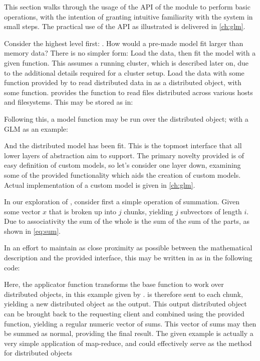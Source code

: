 This section walks through the usage of the API of the \lso module to perform basic operations, with the intention of granting intuitive familiarity with the system in small steps.
The practical use of the API as illustrated is delivered in \cref{ch:glm}.

Consider the highest level first: \lsm.
How would a pre-made model fit larger than memory data?
There is no simpler form: Load the data, then fit the model with a given function.
This assumes a running cluster, which is described later on, due to the additional details required for a cluster setup.
Load the data with some function provided by \lso to read distributed data in as a distributed object, with some  function.
\lso provides the  function to read  files distributed across various hosts and filesystems.
This may be stored as in:


Following this, a model function may be run over the distributed object; with a GLM as an example:


And the distributed model has been fit.
This is the topmost interface that all lower layers of abstraction aim to support.
The primary novelty provided is of easy definition of custom models, so let's consider one layer down, examining some of the provided functionality which aids the creation of custom models.
Actual implementation of a custom model is given in \cref{ch:glm}.

In our exploration of \lso, consider first a simple operation of summation.
Given some vector $x$ that is broken up into $j$ chunks, yielding $j$ subvectors of length $i$.
Due to associativity the sum of the whole is the sum of the sum of the parts, as shown in \cref{eq:sum}.


In an effort to maintain as close proximity as possible between the mathematical description and the provided interface, this may be written in \lso as in the following \R code:


Here, the  applicator function transforms the base  function to work over distributed objects, in this example given by .
 is therefore sent to each chunk, yielding a new distributed object as the output.
This output distributed object can be brought back to the requesting client and combined using the provided  function, yielding a regular \R numeric vector of sums.
This vector of sums may then be summed as normal, providing the final result.
The given example is actually a very simple application of map-reduce, and could effectively serve as the  method for distributed objects

